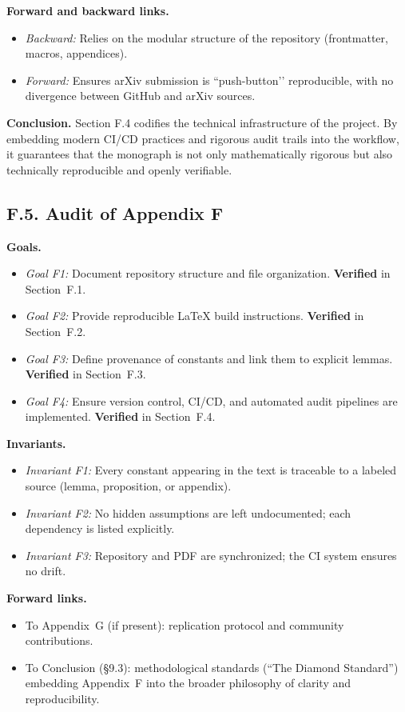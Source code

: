 \medskip
\noindent \textbf{Forward and backward links.}
\begin{itemize}
  \item \emph{Backward:} Relies on the modular structure of the repository (frontmatter, macros, appendices).
  \item \emph{Forward:} Ensures arXiv submission is ``push-button’’ reproducible, with no divergence between GitHub and arXiv sources.
\end{itemize}

\medskip
\noindent \textbf{Conclusion.}
Section F.4 codifies the technical infrastructure of the project. By embedding modern CI/CD practices and rigorous audit trails into the workflow, it guarantees that the monograph is not only mathematically rigorous but also technically reproducible and openly verifiable.

\subsection*{F.5. Audit of Appendix F}

\noindent \textbf{Goals.}
\begin{itemize}
  \item \emph{Goal F1:} Document repository structure and file organization. \textbf{Verified} in Section~F.1.
  \item \emph{Goal F2:} Provide reproducible \LaTeX{} build instructions. \textbf{Verified} in Section~F.2.
  \item \emph{Goal F3:} Define provenance of constants and link them to explicit lemmas. \textbf{Verified} in Section~F.3.
  \item \emph{Goal F4:} Ensure version control, CI/CD, and automated audit pipelines are implemented. \textbf{Verified} in Section~F.4.
\end{itemize}

\medskip
\noindent \textbf{Invariants.}
\begin{itemize}
  \item \emph{Invariant F1:} Every constant appearing in the text is traceable to a labeled source (lemma, proposition, or appendix).
  \item \emph{Invariant F2:} No hidden assumptions are left undocumented; each dependency is listed explicitly.
  \item \emph{Invariant F3:} Repository and PDF are synchronized; the CI system ensures no drift.
\end{itemize}

\medskip
\noindent \textbf{Forward links.}
\begin{itemize}
  \item To Appendix~G (if present): replication protocol and community contributions.
  \item To Conclusion (§9.3): methodological standards (“The Diamond Standard”) embedding Appendix~F into the broader philosophy of clarity and reproducibility.
\end{itemize}

